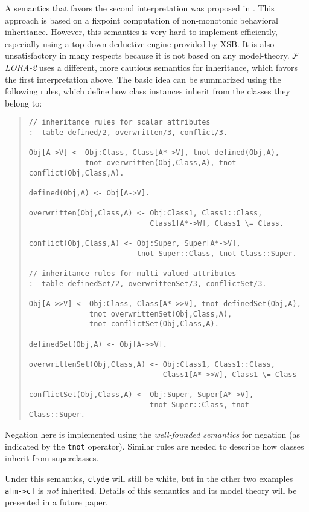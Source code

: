 \documentclass[11pt]{article}
\newcommand{\FLORA}{{\mbox{${\cal F}${\small\it LORA}\rm\emph{-2}}}\xspace}
\begin{document}
A semantics that favors the second interpretation was proposed in
\cite{KLW95}. This approach is based on a fixpoint computation of
non-monotonic behavioral inheritance.  However, this semantics is very hard
to implement efficiently, especially using a top-down deductive engine
provided by XSB. It is also unsatisfactory in many respects because it is
not based on any model-theory. \FLORA uses a different, more cautious
semantics for inheritance, which favors the first interpretation above.
The basic idea can be summarized using the following rules, which define how
class instances inherit from the classes they belong to:
\begin{quote}
\begin{verbatim}
// inheritance rules for scalar attributes
:- table defined/2, overwritten/3, conflict/3.

Obj[A->V] <- Obj:Class, Class[A*->V], tnot defined(Obj,A),
             tnot overwritten(Obj,Class,A), tnot conflict(Obj,Class,A).

defined(Obj,A) <- Obj[A->V].

overwritten(Obj,Class,A) <- Obj:Class1, Class1::Class,
                            Class1[A*->W], Class1 \= Class.

conflict(Obj,Class,A) <- Obj:Super, Super[A*->V],
                         tnot Super::Class, tnot Class::Super.

// inheritance rules for multi-valued attributes
:- table definedSet/2, overwrittenSet/3, conflictSet/3.

Obj[A->>V] <- Obj:Class, Class[A*->>V], tnot definedSet(Obj,A),
              tnot overwrittenSet(Obj,Class,A),
              tnot conflictSet(Obj,Class,A).

definedSet(Obj,A) <- Obj[A->>V].

overwrittenSet(Obj,Class,A) <- Obj:Class1, Class1::Class,
                               Class1[A*->>W], Class1 \= Class

conflictSet(Obj,Class,A) <- Obj:Super, Super[A*->V],
                            tnot Super::Class, tnot Class::Super.
\end{verbatim}
\end{quote}
Negation here is implemented using the {\em well-founded semantics}
for negation \cite{gelder-alternating-89,gelder-ross-schlipf-91} (as
indicated by the {\tt tnot} operator).  Similar rules are needed to
describe how classes inherit from superclasses.

Under this semantics, {\tt clyde} will still be white, but in the other two
examples {\tt a[m->c]} is \emph{not} inherited. Details of this semantics
and its model theory will be presented in a future paper.
\end{document}
